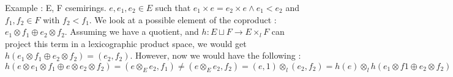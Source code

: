 Example : E, F csemirings. $e,e_1,e_2 \in E$ such that $e_1 \times e = e_2 \times e \land e_1 < e_2$ and $f_1,f_2 \in F$ with $f_2<f_1 $. We look at a possible element of the coproduct : $e_1 \otimes f_1 \oplus e_2 \otimes f_2$. Assuming we have a quotient, and $h : E \sqcup F \rightarrow E \times_l F$ can project this term in a lexicographic product space, we would get $h(e_1 \otimes f_1 \oplus e_2 \otimes f_2) = (e_2,f_2)$. However, now we would have the following :
$$
h(e \otimes e_1 \otimes f_1 \oplus e \otimes e_2 \otimes f_2) = (e \otimes_E e_2,f_1)  \not= (e \otimes_E e_2,f_2) = (e,1)\otimes_l (e_2,f_2) = h(e) \otimes_l h(e_1\otimes f1 \oplus e_2 \otimes f_2)
$$







